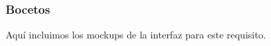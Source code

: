 \newpage %

\subsubsection*{Bocetos}
Aquí incluimos los mockups de la interfaz para este requisito.




\newpage %